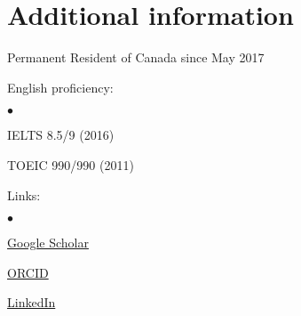 \documentclass[12pt]{article}
\newcommand{\squishlist}{
 \begin{list}{$\bullet$}
  { \setlength{\itemsep}{0pt}
     \setlength{\parsep}{3pt}
     \setlength{\topsep}{3pt}
     \setlength{\partopsep}{0pt}
     \setlength{\leftmargin}{1.5em}
     \setlength{\labelwidth}{1em}
     \setlength{\labelsep}{0.5em} } }%
\newcommand{\squishend}{
  \end{list}  }%
\newcommand{\mySec}[1]{\vspace{-0.5em}\section*{#1}\vspace{-0.5em}}
\begin{document}
 

\mySec{Additional information}

Permanent Resident of Canada since May 2017

\begin{minipage}{0.5\textwidth}
  English proficiency:
  \squishlist
    \item{IELTS 8.5/9 (2016)}
    \item{TOEIC 990/990 (2011)}
  \squishend
\end{minipage}
\begin{minipage}{0.5\textwidth}
  Links:
  \squishlist
    \item{\href{https://scholar.google.com.br/citations?user=0D1ExLoAAAAJ}{Google Scholar}}
    \item{\href{https://orcid.org/0000-0002-8781-583X}{ORCID}}
    \item{\href{https://www.linkedin.com/in/fabio-dias}{LinkedIn}}    
  \squishend
\end{minipage}
\end{document}

